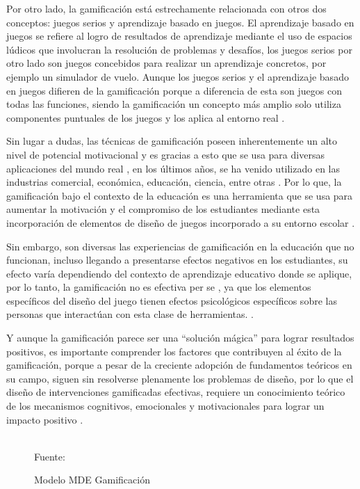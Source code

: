 Por otro lado, la gamificación está estrechamente relacionada con otros dos conceptos: juegos serios y 
aprendizaje basado en juegos. El aprendizaje basado en juegos se refiere al logro de resultados de aprendizaje
mediante el uso de espacios lúdicos que involucran la resolución de problemas y desafíos, los juegos serios
por otro lado son juegos concebidos para realizar un aprendizaje concretos, por ejemplo un simulador de vuelo.
Aunque los juegos serios y el aprendizaje basado en juegos difieren de la gamificación porque a diferencia de
esta son juegos con todas las funciones, siendo la gamificación un concepto más amplio solo utiliza 
componentes puntuales de los juegos y los aplica al entorno real \cite{KRATH2021106963}.

Sin lugar a dudas, las técnicas de gamificación poseen inherentemente un alto nivel de potencial motivacional
y es gracias a esto que se usa para diversas aplicaciones del mundo real \cite{SAILER2017371}, en los últimos 
años, se ha venido utilizado en las industrias comercial, económica, educación, ciencia, entre otras 
\cite{XU2017}. Por lo que, la gamificación bajo el contexto de la educación es una herramienta que se usa para
aumentar la motivación y el compromiso de los estudiantes mediante esta incorporación de elementos de diseño de 
juegos incorporado a su entorno escolar \cite{Li2020}.

Sin embargo, son diversas las experiencias de gamificación en la educación que no funcionan, incluso llegando
a presentarse efectos negativos en los estudiantes, su efecto varía dependiendo del contexto de
aprendizaje educativo donde se aplique, por lo tanto, la gamificación no es efectiva per se 
\cite{KRATH2021106963}, ya que los elementos específicos del diseño del juego tienen efectos psicológicos 
específicos sobre las personas que interactúan con esta clase de herramientas. \cite{SAILER2017371}.

Y aunque la gamificación parece ser una ``solución mágica'' para lograr resultados positivos, es importante
comprender los factores que contribuyen al éxito de la gamificación, porque a pesar de la creciente adopción
de fundamentos teóricos en su campo, siguen sin resolverse plenamente los problemas de diseño, por lo que el
diseño de intervenciones gamificadas efectivas, requiere un conocimiento teórico de los mecanismos cognitivos,
emocionales y motivacionales para lograr un impacto positivo \cite{KRATH2021106963}.

\begin{figure}[ht]
\caption{Modelo MDE Gamificación}
\label{img:MDE}
\centering

\\
{\footnotesize Fuente: }
\end{figure}

